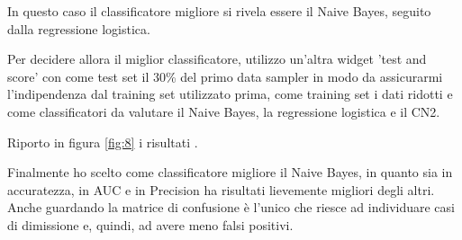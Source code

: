 \documentclass[a4paper, 12p]{report}
\begin{document}
In questo caso il classificatore migliore si rivela essere il Naive Bayes, seguito dalla regressione logistica.

Per decidere allora il miglior classificatore, utilizzo un'altra widget 'test and score' con come test set il 30\% del primo data sampler in modo da assicurarmi l'indipendenza dal training set utilizzato prima, come training set i dati ridotti e come classificatori da valutare il Naive Bayes, la regressione logistica e il CN2.

Riporto in figura \ref{fig:8} i risultati . 

Finalmente ho scelto come classificatore migliore il Naive Bayes, in quanto sia in accuratezza, in AUC e in Precision ha risultati lievemente migliori degli altri. Anche guardando la matrice di confusione è l'unico che riesce ad individuare casi di dimissione e, quindi, ad avere meno falsi positivi.
\end{document}
